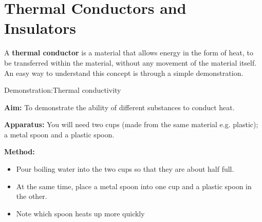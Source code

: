            \section{Thermal Conductors and Insulators}
            \nopagebreak
      \label{m38706*id66527}A \textbf{thermal conductor} is a material that allows energy in the form of heat, to be transferred within the material, without any movement of the material itself. An easy way to understand this concept is through a simple demonstration.\par 
\label{m38706*secfhsst!!!underscore!!!id453}
            \begin{gexperiment}{Demonstration:Thermal conductivity}{
            \nopagebreak
            \label{m38706*id66568}\noindent{}\textbf{Aim: }\newline
    To demonstrate the ability of different substances to conduct heat.\par 
      \label{m38706*id66588}\noindent{}\textbf{Apparatus: }\newline
    You will need two cups (made from the same material e.g. plastic); a metal spoon and a plastic spoon.\par 
	\begin{figure}[H] %
    \begin{center}
    \end{center}
 \end{figure} 
      \label{m38706*id66592}\noindent{}\textbf{Method: }
      \label{m38706*id66609}\begin{itemize}[noitemsep]
            \label{m38706*uid102}\item Pour boiling water into the two cups so that they are about half full.
\label{m38706*uid103}\item At the same time, place a metal spoon into one cup and a plastic spoon in the other.
\label{m38706*uid104}\item Note which spoon heats up more quickly

\end{itemize}}
\end{gexperiment}

